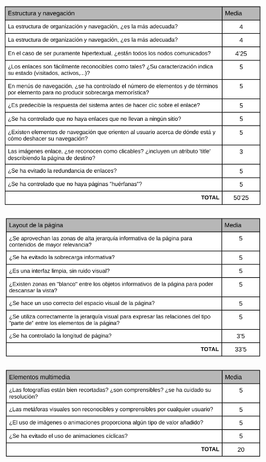\documentclass[pdftex,11pt,a4paper]{book}
\begin{document}
\begin{figure}[h]
\begin{center}
\includegraphics[width=\textwidth]{img/heuristico7}
\caption{\label{heuristico7}}
\end{center}
\end{figure}

\begin{figure}[h]
\begin{center}
\includegraphics[width=\textwidth]{img/heuristico8}
\caption{\label{heuristico8}}
\end{center}
\end{figure}

\begin{figure}[h]
\begin{center}
\includegraphics[width=\textwidth]{img/heuristico9}
\caption{\label{heuristico9}}
\end{center}
\end{figure}
\end{document}
